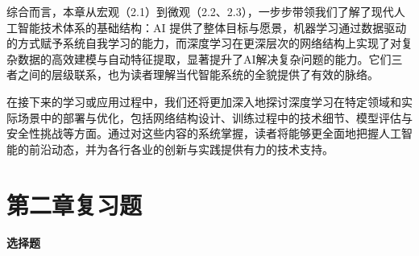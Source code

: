 综合而言，本章从宏观（2.1）到微观（2.2、2.3），一步步带领我们了解了现代人工智能技术体系的基础结构：AI 提供了整体目标与愿景，机器学习通过数据驱动的方式赋予系统自我学习的能力，而深度学习在更深层次的网络结构上实现了对复杂数据的高效建模与自动特征提取，显著提升了AI解决复杂问题的能力。它们三者之间的层级联系，也为读者理解当代智能系统的全貌提供了有效的脉络。

在接下来的学习或应用过程中，我们还将更加深入地探讨深度学习在特定领域和实际场景中的部署与优化，包括网络结构设计、训练过程中的技术细节、模型评估与安全性挑战等方面。通过对这些内容的系统掌握，读者将能够更全面地把握人工智能的前沿动态，并为各行各业的创新与实践提供有力的技术支持。


\section{第二章复习题}

\textbf{选择题}

